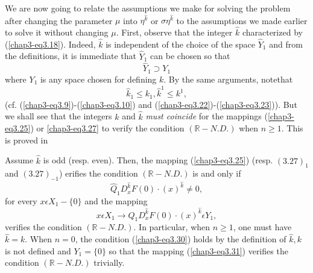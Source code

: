 We are now going to relate the assumptions we make for solving the
problem after changing the parameter $\mu$ into $\eta^{\hat{k}}$ or
$\sigma \eta^{\hat{k}}$ to the assumptions we made earlier to solve it
without changing $\mu$. First, observe that the integer $\hat{k}$
characterized by (\ref{chap3-eq3.18}). Indeed, $\hat{k}$ is
independent of the choice of the space $\hat{Y}_{1}$ and from the
definitions, it is immediate that $\hat{Y}_{1}$ can be chosen so that 
\begin{equation*}
\hat{Y}_{1} \supset Y_{1}\tag{3.28}\label{chap3-eq3.28}
\end{equation*}
where $Y_{1}$ is any space chosen for defining $k$. By the same
arguments, note\pageoriginale that
\begin{equation*}
\hat{k}_{1} \leq k_{1}, \hat{k}^{1} \leq k^{1},\tag{3.29}\label{chap3-eq3.29}
\end{equation*}
(cf. (\ref{chap3-eq3.9})-(\ref{chap3-eq3.10}) and
(\ref{chap3-eq3.22})-(\ref{chap3-eq3.23})). But we shall see that the
integers $k$ and $\hat{k}$ {\em must coincide} for the mappings
(\ref{chap3-eq3.25}) or \ref{chap3-eq3.27} to verify the condition
$(\mathbb{R}-N.D.)$ when $n \geq 1$. This is proved in
\begin{proposition}\label{chap3-prop3.1}
Assume $\hat{k}$ is odd (resp. even). Then, the mapping
(\ref{chap3-eq3.25}) (resp. $(3.27)_{1}$ and $(3.27)_{-1}$) erifies
the condition $(\mathbb{R}-N.D.)$ is and only if
\begin{equation*}
\hat{Q}_{1}D_{x}^{\hat{k}}F(0) \cdot (x)^{\hat{k}} \neq 0,\tag{3.30}\label{chap3-eq3.30}
\end{equation*}
for every $x \epsilon X_{1} - \{0\}$ and the mapping
\begin{equation*}
x \epsilon X_{1} \to Q_{1}D_{x}^{\hat{k}}F(0) \cdot (x)^{\hat{k}}
\epsilon Y_{1},\tag{3.31}\label{chap3-eq3.31}
\end{equation*}
verifies the condition $(\mathbb{R}-N.D.)$. In particular, when $n
\geq 1$, one must have $\hat{k} = k$. When $n = 0$, the condition
(\ref{chap3-eq3.30}) holds by the definition of $\hat{k}, k$ is not
defined and $Y_{1} = \{0\}$ so that the mapping (\ref{chap3-eq3.31})
verifies the condition $(\mathbb{R}-N.D.)$ trivially.
\end{proposition}

